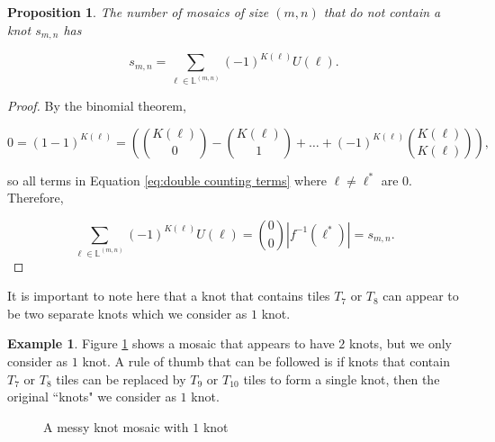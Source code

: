 \documentclass[12pt]{article}
\theoremstyle{plain}
\newtheorem{prop}[thm]{Proposition}
\theoremstyle{definition}
\theoremstyle{remark}
\theoremstyle{definition}
\newtheorem{exmp}{Example}[section]
\newcommand{\cell}[4]{ \draw[thick] ( #1 , #2 ) rectangle ( #3 , #4 );}
\newcommand{\cellA}[4]{\draw[red, thick, densely dotted] ( #1 + 0.5 , #2 ) arc(0:90:{0.5}); \draw[thick] ( #1 , #2 ) rectangle ( #3 , #4 );}
\newcommand{\cellB}[4]{\draw[red, thick, densely dotted] ( #1 + 1 , #2 + 0.5 ) arc(90:180:{0.5}); \draw[thick] ( #1 , #2 ) rectangle ( #3 , #4 );}
\newcommand{\cellC}[4]{\draw[red, thick, densely dotted] ( #1 + 0.5, #2 + 1 ) arc(180:270:{0.5}); \draw[thick] ( #1 , #2 ) rectangle ( #3 , #4 );}
\newcommand{\cellD}[4]{\draw[red, thick, densely dotted] ( #1 , #2 + 0.5 ) arc(-90:0:{0.5}); \draw[thick] ( #1 , #2 ) rectangle ( #3 , #4 );}
\newcommand{\cellE}[4]{\draw[red, thick, densely dotted] (#3, #4 * 0.5 + #2 * 0.5) -- (#1, #4 * 0.5 + #2 * 0.5); \draw[thick] ( #1 , #2 ) rectangle ( #3 , #4 );}
\newcommand{\cellF}[4]{\draw[red, thick, densely dotted] (#3 * 0.5 + #1 * 0.5 , #2) -- (#3 * 0.5 + #1 * 0.5 , #4); \draw[thick] ( #1 , #2 ) rectangle ( #3 , #4 );}
\newcommand{\cellG}[4]{\draw[red, thick, densely dotted] ( #1 + 0.5 , #2 ) arc(0:90:{0.5}); \draw[red, thick, densely dotted] ( #1 + 0.5, #2 + 1 ) arc(180:270:{0.5}); \draw[thick] ( #1 , #2 ) rectangle ( #3 , #4 );}
\newcommand{\cellH}[4]{\draw[red, thick, densely dotted] ( #1 , #2 + 0.5 ) arc(-90:0:{0.5}); \draw[red, thick, densely dotted] ( #1 + 1 , #2 + 0.5 ) arc(90:180:{0.5}); \draw[thick] ( #1 , #2 ) rectangle ( #3 , #4 );}
\newcommand{\cellI}[4]{\draw[red, thick, densely dotted] (#3 * 0.5 + #1 * 0.5 , #2) -- (#3 * 0.5 + #1 * 0.5 , #4); \node[shape=circle,draw=none,fill=white, inner sep=3pt,minimum size=5pt] (A) at ( #1 + 0.5 , #2 + 0.5 ) {}; \draw[red, thick, densely dotted] (#3, #4 * 0.5 + #2 * 0.5) -- (#1, #4 * 0.5 + #2 * 0.5); \draw[thick] ( #1 , #2 ) rectangle ( #3 , #4 );}
\newcommand{\cellAf}[4]{\filldraw[gray!40] ( #1 , #2 ) rectangle ( #3 , #4 ); \draw[red, thick, densely dotted] ( #1 + 0.5 , #2 ) arc(0:90:{0.5}); \draw[thick] ( #1 , #2 ) rectangle ( #3 , #4 );}
\newcommand{\cellBf}[4]{\filldraw[gray!40] ( #1 , #2 ) rectangle ( #3 , #4 ); \draw[red, thick, densely dotted] ( #1 + 1 , #2 + 0.5 ) arc(90:180:{0.5}); \draw[thick] ( #1 , #2 ) rectangle ( #3 , #4 );}
\newcommand{\cellCf}[4]{\filldraw[gray!40] ( #1 , #2 ) rectangle ( #3 , #4 ); \draw[red, thick, densely dotted] ( #1 + 0.5, #2 + 1 ) arc(180:270:{0.5}); \draw[thick] ( #1 , #2 ) rectangle ( #3 , #4 );}
\newcommand{\cellDf}[4]{\filldraw[gray!40] ( #1 , #2 ) rectangle ( #3 , #4 ); \draw[red, thick, densely dotted] ( #1 , #2 + 0.5 ) arc(-90:0:{0.5}); \draw[thick] ( #1 , #2 ) rectangle ( #3 , #4 );}
\newcommand{\cellFf}[4]{\filldraw[gray!40] ( #1 , #2 ) rectangle ( #3 , #4 ); \draw[red, thick, densely dotted] (#3 * 0.5 + #1 * 0.5 , #2) -- (#3 * 0.5 + #1 * 0.5 , #4); \draw[thick] ( #1 , #2 ) rectangle ( #3 , #4 );}
\newcommand{\cellHf}[4]{\filldraw[gray!40] ( #1 , #2 ) rectangle ( #3 , #4 ); \draw[red, thick, densely dotted] ( #1 , #2 + 0.5 ) arc(-90:0:{0.5}); \draw[red, thick, densely dotted] ( #1 + 1 , #2 + 0.5 ) arc(90:180:{0.5}); \draw[thick] ( #1 , #2 ) rectangle ( #3 , #4 );}
\begin{document}
\begin{prop}
    The number of mosaics of size $(m,n)$ that do not contain a knot $s_{m,n}$ has

    \begin{equation}
    s_{m,n} = \sum_{\ell \in \mathbb{L}^{(m,n)}} (-1)^{K(\ell)} U(\ell).
    \label{eq:ugly inc excl}
    \end{equation}
\end{prop}

\begin{proof}
    By the binomial theorem,
    
    $$0 = (1-1)^{K(\ell)} = \left(\binom{K(\ell)}{0} - \binom{K(\ell)}{1} + \dots + (-1)^{K(\ell)}\binom{K(\ell)}{K(\ell)}\right),$$
    
    so all terms in Equation \ref{eq:double counting terms} where $\ell \neq \ell^*$ are $0$. Therefore, 
    
    $$\sum_{\ell \in \mathbb{L}^{(m,n)}} (-1)^{K(\ell)} U(\ell) = \binom{0}{0}|f^{-1}(\ell^*)| = s_{m,n}.$$
\end{proof}

It is important to note here that a knot that contains tiles $T_7$ or $T_8$ can appear to be two separate knots which we consider as $1$ knot.

\begin{exmp}
Figure \ref{fig:messy multi knot} shows a mosaic that appears to have $2$ knots, but we only consider as $1$ knot. A rule of thumb that can be followed is if knots that contain $T_7$ or $T_8$ tiles can be replaced by $T_9$ or $T_{10}$ tiles to form a single knot, then the original ``knots" we consider as $1$ knot.

\begin{figure}[h!]
\begin{center}


\end{center}
\caption{A messy knot mosaic with $1$ knot}
\label{fig:messy multi knot}
\end{figure}

\end{exmp}
\end{document}
